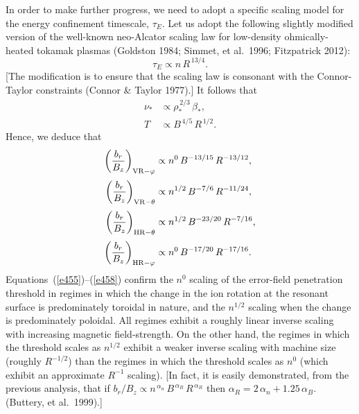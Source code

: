 \documentclass[notitlepage,12pt]{article}
\begin{document}
In order to make further progress, we need to adopt a specific scaling model for the energy confinement timescale, $\tau_E$. Let us adopt
the following slightly modified version of the well-known neo-Alcator scaling law for low-density ohmically-heated tokamak plasmas (Goldston 1984; Simmet, et al.\ 1996; Fitzpatrick 2012): 
\begin{equation}
\tau_E\propto n\,R^{\,13/4}.
\end{equation}
[The modification is to ensure that the scaling law is consonant with the Connor-Taylor constraints (Connor \& Taylor 1977).]
It follows that
\begin{align}
\nu_\ast&\propto \rho_\ast^{\,2/3}\,\beta_\ast,\\[0.5ex]
T&\propto B^{\,4/5}\,R^{\,1/2}.
\end{align}
Hence, we deduce that 
\begin{align}\label{e455}
\left(\frac{b_{r}}{B_z}\right)_{{\rm VR}-\varphi} &\propto n^{0}\,B^{-13/15}\,R^{-13/12},\\[0.5ex]
\left(\frac{b_{r}}{B_z}\right)_{{\rm VR}-\theta} &\propto n^{1/2}\,B^{-7/6}\,R^{-11/24},\\[0.5ex]
\left(\frac{b_{r}}{B_z}\right)_{{\rm HR}-\theta} &\propto n^{1/2}\,B^{-23/20}\,R^{-7/16},\\[0.5ex]
\left(\frac{b_{r}}{B_z}\right)_{{\rm HR}-\varphi} &\propto n^{0}\,B^{-17/20}\,R^{-17/16}.\label{e458}
\end{align}
Equations~(\ref{e455})--(\ref{e458}) confirm the $n^{0}$ scaling of the error-field penetration threshold in regimes in which the change in the ion rotation at the resonant surface is predominately toroidal
in nature, and the $n^{1/2}$ scaling when the change is predominately poloidal. All regimes exhibit a roughly linear inverse scaling with increasing magnetic field-strength. On the other hand, the regimes in which the threshold scales as $n^{1/2}$ exhibit a
weaker inverse scaling with machine size (roughly $R^{-1/2}$) than the regimes in which the threshold scales as $n^0$ (which
exhibit an approximate $R^{-1}$ scaling). [In fact, it is easily demonstrated, from the previous analysis, that if 
$b_r/B_z\propto n^{\,\alpha_n}\,B^{\,\alpha_B}\,R^{\,\alpha_R}$ then $\alpha_R = 2\,\alpha_n+1.25\,\alpha_B$. (Buttery, et al.\ 1999).]
\end{document}
